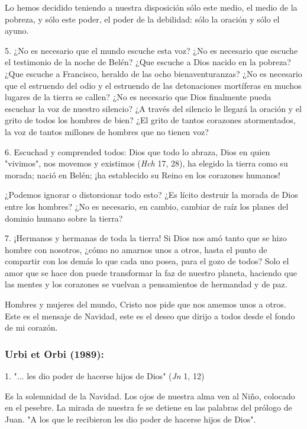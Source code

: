 \begin{body}
\begin{body}
Lo hemos decidido teniendo a nuestra disposición sólo este medio, el medio de la pobreza, y sólo este poder, el poder de la debilidad: sólo la oración y sólo el ayuno.

5. ¿No es necesario que el mundo escuche esta voz? ¿No es necesario que escuche el testimonio de la noche de Belén? ¿Que escuche a Dios nacido en la pobreza? ¿Que escuche a Francisco, heraldo de las ocho bienaventuranzas? ¿No es necesario que el estruendo del odio y el estruendo de las detonaciones mortíferas en muchos lugares de la tierra se callen? ¿No es necesario que Dios finalmente pueda escuchar la voz de nuestro silencio? ¿A través del silencio le llegará la oración y el grito de todos los hombres de bien? ¿El grito de tantos corazones atormentados, la voz de tantos millones de hombres que no tienen voz?

6. Escuchad y comprended todos: Dios que todo lo abraza, Dios en quien "vivimos", nos movemos y existimos (\emph{Hch} 17, 28), ha elegido la tierra como su morada; nació en Belén; ¡ha establecido su Reino en los corazones humanos!

¿Podemos ignorar o distorsionar todo esto? ¿Es lícito destruir la morada de Dios entre los hombres? ¿No es necesario, en cambio, cambiar de raíz los planes del dominio humano sobre la tierra?

7. ¡Hermanos y hermanas de toda la tierra! Si Dios nos amó tanto que se hizo hombre con nosotros, ¿cómo no amarnos unos a otros, hasta el punto de compartir con los demás lo que cada uno posea, para el gozo de todos? Solo el amor que se hace don puede transformar la faz de nuestro planeta, haciendo que las mentes y los corazones se vuelvan a pensamientos de hermandad y de paz.

Hombres y mujeres del mundo, Cristo nos pide que nos amemos unos a otros. Este es el mensaje de Navidad, este es el deseo que dirijo a todos desde el fondo de mi corazón.
\end{body} 
	
\subsubsection{Urbi et Orbi (1989): }

\begin{body} 
1. "... les dio poder de hacerse hijos de Dios" (\emph{Jn} 1, 12)

Es la solemnidad de la Navidad. Los ojos de nuestra alma ven al Niño, colocado en el pesebre. La mirada de nuestra fe se detiene en las palabras del prólogo de Juan. "A los que le recibieron les dio poder de hacerse hijos de Dios".


\end{body}
\end{body}
